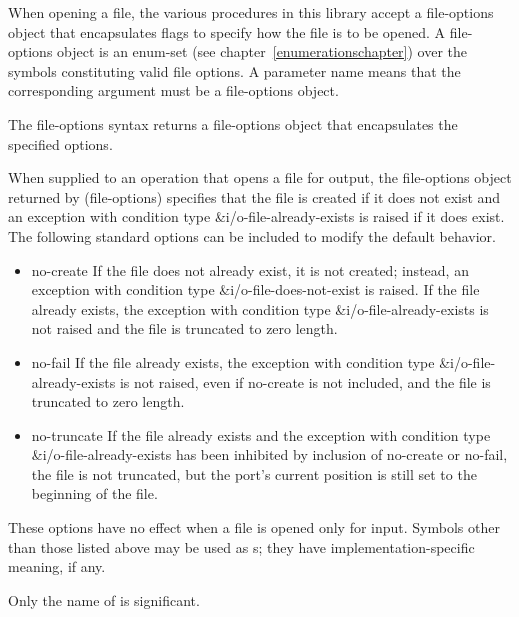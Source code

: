 When opening a file, the various procedures in this library accept a
{\cf file-options} object that encapsulates flags to specify how
the file is to be opened. A {\cf file-options} object is an enum-set
(see chapter~\ref{enumerationschapter}) over the symbols constituting
valid file options.
A  parameter name means that the
corresponding argument must be a file-options object.

\begin{entry}{%
}

The {\cf file-options} syntax returns a file-options object that 
encapsulates the
specified options.

When supplied to an operation that opens a file for output, the
file-options object returned by {\cf (file-options)} specifies that the
file is created if it does not exist and an exception with condition type
{\cf\&i/o-file-already-exists} is raised if it does exist.
The following standard options can be included to modify the default behavior.

\begin{itemize}   
\item {\cf no-create}
      If the file does not already exist, it is not created;
      instead, an exception with condition type {\cf\&i/o-file-does-not-exist}
      is raised.
      If the file already exists, the exception with condition type
      {\cf\&i/o-file-already-exists} is not raised
      and the file is truncated to zero length.
\item {\cf no-fail}
      If the file already exists, the exception with condition type
      {\cf\&i/o-file-already-exists} is not raised,
      even if {\cf no-create} is not included,
      and the file is truncated to zero length.
\item {\cf no-truncate}
      If the file already exists and the exception with condition type
      {\cf\&i/o-file-already-exists} has been inhibited by inclusion of
      {\cf no-create} or {\cf no-fail}, the file is not truncated, but
      the port's current position is still set to the beginning of the
      file.
\end{itemize}

These options have no effect when a file is opened only for input.
Symbols
other than those listed above may be used as s;
they have implementation-specific meaning, if any.

\begin{note}
  Only the name of  is significant.
\end{note}
\end{entry}   

